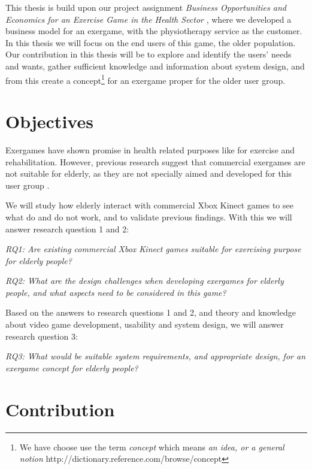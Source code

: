 This thesis is build upon our project assignment \emph{Business Opportunities and Economics for an Exercise Game in the Health Sector} \cite{project}, where we developed a business model for an exergame, with the physiotherapy service as the customer. In this thesis we will focus on the end users of this game, the older population. Our contribution in this thesis will be to explore and identify the users' needs and wants, gather sufficient knowledge and information about system design, and from this create a concept\footnote{We have choose use the term \emph{concept} which means \emph{an idea, or a general notion} http://dictionary.reference.com/browse/concept} for an exergame proper for the older user group.

\section{Objectives}
\label{sec:researchq} Exergames have shown promise in health related purposes like for exercise and rehabilitation. However, previous research suggest that commercial exergames are not suitable for elderly, as they are not specially aimed and developed for this user group \cite{exergamesforelderly} \cite{gerling2} \cite{bruin} \cite{project}. 

We will study how elderly interact with commercial Xbox Kinect games to see what do and do not work, and to validate previous findings. With this we will answer research question 1 and 2: 

\emph{RQ1: Are existing commercial Xbox Kinect games suitable for exercising purpose for elderly people?} 

\emph{RQ2: What are the design challenges when developing exergames for elderly people, and what aspects need to be considered in this game?}

Based on the answers to research questions 1 and 2, and theory and knowledge about video game development, usability and system design, we will answer research question 3:

\emph{RQ3: What would be suitable system requirements, and appropriate design, for an exergame concept for elderly people?}

\section{Contribution}

